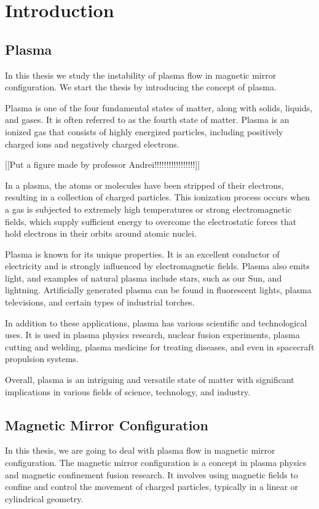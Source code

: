 \chapter{Introduction}
\cite{aikawa_stability_1979}
\section{Plasma}


In this thesis we study the instability of plasma flow in magnetic mirror configuration. We start the thesis by introducing the concept of plasma.

Plasma is one of the four fundamental states of matter, along with solids, liquids, and gases. It is often referred to as the fourth state of matter. Plasma is an ionized gas that consists of highly energized particles, including positively charged ions and negatively charged electrons.

[[Put a figure made by professor Andrei!!!!!!!!!!!!!!!!!]]


In a plasma, the atoms or molecules have been stripped of their electrons, resulting in a collection of charged particles. This ionization process occurs when a gas is subjected to extremely high temperatures or strong electromagnetic fields, which supply sufficient energy to overcome the electrostatic forces that hold electrons in their orbits around atomic nuclei.

Plasma is known for its unique properties. It is an excellent conductor of electricity and is strongly influenced by electromagnetic fields. Plasma also emits light, and examples of natural plasma include stars, such as our Sun, and lightning. Artificially generated plasma can be found in fluorescent lights, plasma televisions, and certain types of industrial torches.

In addition to these applications, plasma has various scientific and technological uses. It is used in plasma physics research, nuclear fusion experiments, plasma cutting and welding, plasma medicine for treating diseases, and even in spacecraft propulsion systems.

Overall, plasma is an intriguing and versatile state of matter with significant implications in various fields of science, technology, and industry.

\section{Magnetic Mirror Configuration}
In this thesis, we are going to deal with plasma flow in magnetic mirror configuration.
The magnetic mirror configuration is a concept in plasma physics and magnetic confinement fusion research. It involves using magnetic fields to confine and control the movement of charged particles, typically in a linear or cylindrical geometry.

